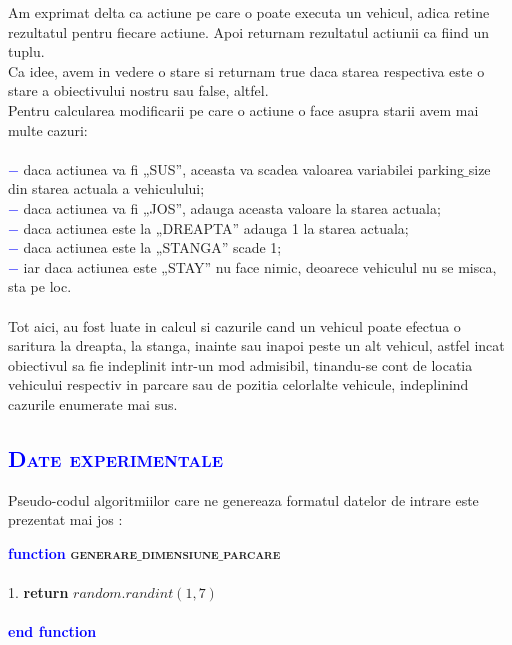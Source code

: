 \documentclass{article}
\begin{document}
\vspace{7mm}
\quad \par Am exprimat delta ca actiune pe care o poate executa un vehicul, adica retine rezultatul pentru fiecare actiune. Apoi returnam rezultatul actiunii ca fiind un tuplu.\\ Ca idee, avem in vedere o stare si returnam true daca starea respectiva este o stare a obiectivului nostru sau false, altfel.\\
\quad Pentru calcularea modificarii pe care o actiune o face asupra starii avem mai multe cazuri:\\\\
\textcolor{blue}{\bfseries$-$} daca actiunea va fi „SUS”, aceasta va scadea valoarea variabilei parking$\_$size din starea actuala a vehiculului;\\
\textcolor{blue}{\bfseries$-$} daca actiunea va fi „JOS”, adauga aceasta valoare la starea actuala;\\
\textcolor{blue}{\bfseries$-$} daca actiunea este la „DREAPTA” adauga 1 la starea actuala;\\
\textcolor{blue}{\bfseries$-$} daca actiunea este la „STANGA” scade 1;\\
\textcolor{blue}{\bfseries$-$} iar daca actiunea este „STAY” nu face nimic, deoarece vehiculul nu se misca, sta pe loc.\\\\
Tot aici, au fost luate in calcul si cazurile cand un vehicul poate efectua o saritura la dreapta, la stanga, inainte sau inapoi peste un alt vehicul, astfel incat obiectivul sa fie indeplinit intr-un mod admisibil, tinandu-se cont de locatia vehicului respectiv in parcare sau de pozitia celorlalte vehicule, indeplinind cazurile enumerate mai sus.
\newpage
\begin{center}
     \textcolor{blue}{\section{\bfseries\scshape\textcolor{blue}{Date experimentale}}}
\end{center}
\quad 
Pseudo-codul algoritmiilor care ne genereaza formatul datelor de intrare este prezentat mai jos :
\par
\vspace{15mm}
\begin{center}
\begin{tabbing}
\large
\indent\textbf{\textcolor{blue}{func}}\=\textbf{\textcolor{blue}{tion}}
\textsc{\bfseries{generare$\_$dimensiune$\_$parcare}}\\\\
1.\indent \> \textbf{return} $random.randint(1,7)$\\\\
\indent\textbf{\textcolor{blue}{end }}\=\textbf{\textcolor{blue}{function}}
\end{tabbing}
\end{center}
\end{document}

